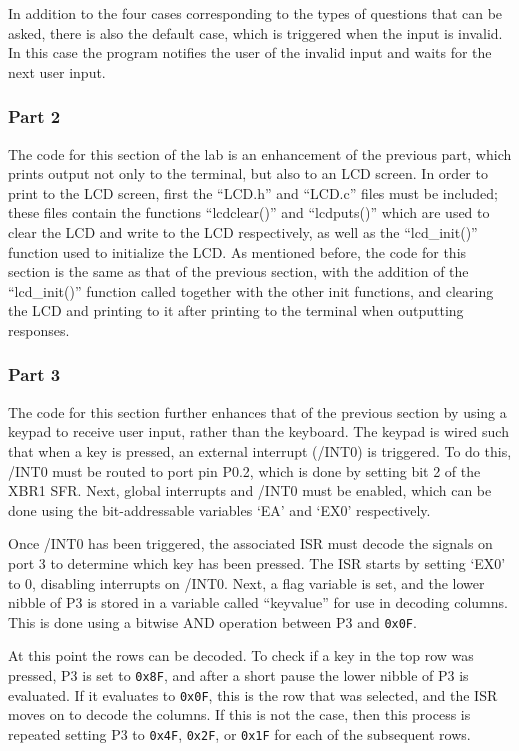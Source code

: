 \documentclass[12pt]{article}
\begin{document}
In addition to the four cases corresponding to the types of questions that can be asked, there is also the default case, which is triggered when the input is invalid. In this case the program notifies the user of the invalid input and waits for the next user input. 

\subsubsection{Part 2}
The code for this section of the lab is an enhancement of the previous part, which prints output not only to the terminal, but also to an LCD screen. In order to print to the LCD screen, first the ``LCD.h'' and ``LCD.c'' files must be included; these files contain the functions ``lcd\textunderscore clear()'' and ``lcd\textunderscore puts()'' which are used to clear the LCD and write to the LCD respectively, as well as the ``lcd\_init()'' function used to initialize the LCD. As mentioned before, the code for this section is the same as that of the previous section, with the addition of the ``lcd\_init()'' function called together with the other init functions, and clearing the LCD and printing to it after printing to the terminal when outputting responses. 

\subsubsection{Part 3}
The code for this section further enhances that of the previous section by using a keypad to receive user input, rather than the keyboard. The keypad is wired such that when a key is pressed, an external interrupt (/INT0) is triggered. To do this, /INT0 must be routed to port pin P0.2, which is done by setting bit 2 of the XBR1 SFR. Next, global interrupts and /INT0 must be enabled, which can be done using the bit-addressable variables `EA' and `EX0' respectively. 

Once /INT0 has been triggered, the associated ISR must decode the signals on port 3 to determine which key has been pressed. The ISR starts by setting `EX0' to 0, disabling interrupts on /INT0. Next, a flag variable is set, and the lower nibble of P3 is stored in a variable called ``keyvalue'' for use in decoding columns. This is done using a bitwise AND operation between P3 and \texttt{0x0F}.

At this point the rows can be decoded. To check if a key in the top row was pressed, P3 is set to \texttt{0x8F}, and after a short pause the lower nibble of P3 is evaluated. If it evaluates to \texttt{0x0F}, this is the row that was selected, and the ISR moves on to decode the columns. If this is not the case, then this process is repeated setting P3 to \texttt{0x4F}, \texttt{0x2F}, or \texttt{0x1F} for each of the subsequent rows. 
\end{document}
